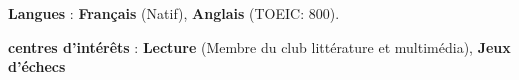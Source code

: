 

\begin{cventries}

\renewcommand{\labelitemi}{}
\begin{cvitems} %
    \small
    \item {\textbf{Langues} : \textbf{Français} (Natif), \textbf{Anglais} (TOEIC: 800).}
    \item {\textbf{centres d’intérêts} : \textbf{Lecture} (Membre du club littérature et multimédia), \textbf{Jeux d'échecs}}
\end{cvitems}
\end{cventries}
